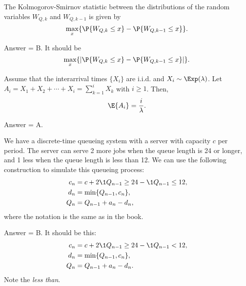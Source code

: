 \begin{exercise}[201803]
The Kolmogorov-Smirnov statistic between the distributions of the random variables $W_{Q,k}$ and $W_{Q,k-1}$ is given by
\begin{equation*}
 \max_x\{ \P{W_{Q,k}\leq x} - \P{W_{Q,k-1}\leq x}\}.
\end{equation*}

\begin{solution}
Answer = B. It should be
\begin{equation*}
 \max_x\{|\P{W_{Q,k}\leq x} - \P{W_{Q,k-1}\leq x}|\}.
\end{equation*}

\end{solution}
\end{exercise}


\begin{exercise}[201804]
 Assume that the interarrival times $\{X_i\}$ are i.i.d. and
 $X_i\sim\Exp(\lambda)$. Let
 $A_i=X_1+X_2+\cdots+X_i=\sum_{k=1}^i X_k$ with $i\geq 1$. Then,
 \begin{equation*}
\E{A_i} = \frac i\lambda.
 \end{equation*}
\begin{solution}
Answer = A.
\end{solution}
\end{exercise}

\begin{exercise}[201804]
We have a discrete-time queueing system with a server with capacity $c$ per period. The server can serve 2 more jobs
when the queue length is 24 or longer, and 1 less when the queue length is less than 12. 
We can use the following construction to simulate this queueing process:
\begin{align*}
c_n &= c + 2\1{Q_{n-1} \geq 24} - \1{Q_{n-1} \leq 12},\\
 d_n &= \min\{Q_{n-1}, c_n\}, \\
Q_n &= Q_{n-1} + a_n - d_n,
\end{align*}
where the notation is the same as in the book.
\begin{solution}
Answer = B. It should be this:
\begin{align*}
c_n &= c + 2\1{Q_{n-1} \geq 24} - \1{Q_{n-1} < 12},\\
 d_n &= \min\{Q_{n-1}, c_n\}, \\
Q_n &= Q_{n-1} + a_n - d_n.
\end{align*}
Note the \emph{less than}.
\end{solution}
\end{exercise}

